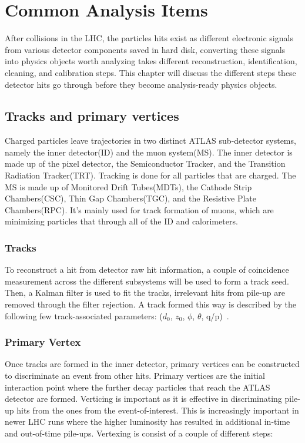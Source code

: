 \chapter{Common Analysis Items}

After collisions in the LHC, the particles hits exist as different electronic signals from various detector components saved in hard disk, converting these signals into physics objects worth analyzing takes different reconstruction, identification, cleaning, and calibration steps. This chapter will discuss the different steps these detector hits go through before they become analysis-ready physics objects. 

\section{Tracks and primary vertices}

Charged particles leave trajectories in two distinct ATLAS sub-detector systems, namely the inner detector(ID) and the muon system(MS). The inner detector is made up of the pixel detector, the Semiconductor Tracker, and the Transition Radiation Tracker(TRT). Tracking is done for all particles that are charged. 
The MS is made up of Monitored Drift Tubes(MDTs), the Cathode Strip Chambers(CSC), Thin Gap Chambers(TGC), and the Resistive Plate Chambers(RPC). It's mainly used for
track formation of muons, which are minimizing particles that through all of the ID and calorimeters.


\subsection*{Tracks}
To reconstruct a hit from detector raw hit information, a couple of  coincidence measurement across the different subsystems will be used to form a track seed. Then, a Kalman filter is used to fit the tracks,  irrelevant hits from pile-up are removed through the filter rejection.  
A track formed this way is described by the following few track-associated parameters: ($d_{0}$, $z_{0}$, $\phi$, $\theta$, q/p)~\cite{}.

\subsection*{Primary Vertex}
Once tracks are formed in the inner detector, primary vertices can be constructed to discriminate an event from other hits. 
Primary vertices are the initial interaction point where the further decay particles that reach the ATLAS detector are formed. Verticing is important as it is effective in discriminating pile-up hits from the ones from the event-of-interest. This is increasingly important in newer LHC runs where the higher luminosity has resulted in additional in-time and out-of-time pile-ups. 
Vertexing is consist of a couple of different steps:

